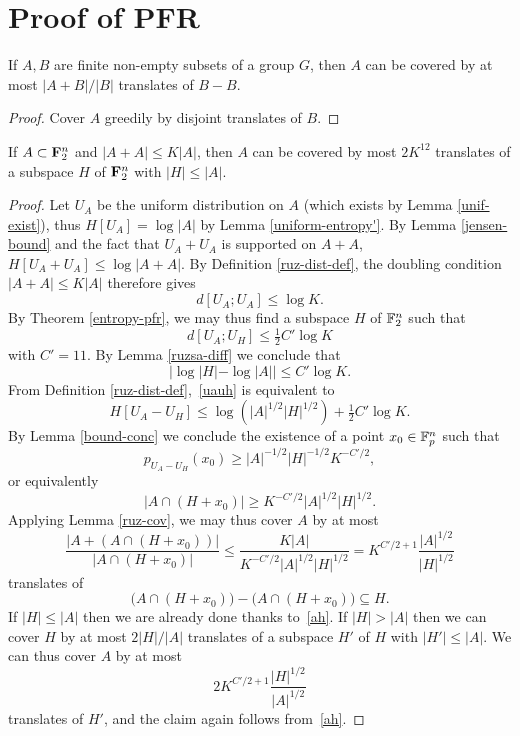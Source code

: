 \chapter{Proof of PFR}

\begin{lemma}
\label{ruz-cov}
\leanok
If $A,B$ are finite non-empty subsets of a group $G$, then $A$ can be covered by at most $|A+B|/|B|$ translates of $B-B$.
\end{lemma}
\begin{proof}
\leanok
Cover $A$ greedily by disjoint translates of $B$.
\end{proof}

\begin{theorem}[PFR]\label{pfr}
If $A \subset {\bf F}_2^n$ and $|A+A| \leq K|A|$, then $A$ can be covered by most $2K^{12}$ translates of a subspace $H$ of ${\bf F}_2^n$ with $|H| \leq |A|$.
\end{theorem}

\begin{proof}
  Let $U_A$ be the uniform distribution on $A$ (which exists by Lemma \ref{unif-exist}), thus $H[U_A] = \log |A|$ by Lemma \ref{uniform-entropy'}. By Lemma \ref{jensen-bound} and the fact that $U_A + U_A$ is supported on $A + A$, $H[U_A + U_A] \leq \log|A+A|$. By Definition \ref{ruz-dist-def}, the doubling condition $|A+A| \leq K|A|$ therefore gives
  \[ d[U_A;U_A] \leq \log K.\]
  By Theorem \ref{entropy-pfr}, we may thus find a subspace $H$ of $\mathbb{F}_2^n$ such that
  \begin{equation}\label{uauh} d[U_A;U_H] \leq \tfrac{1}{2} C' \log K\end{equation}
  with $C' = 11$.
  By Lemma \ref{ruzsa-diff} we conclude that
  \begin{equation}\label{ah}
    |\log |H| - \log |A|| \leq C' \log K.
  \end{equation}
  From Definition \ref{ruz-dist-def},~\eqref{uauh} is equivalent to
  \[ H[U_A - U_H] \leq \log( |A|^{1/2} |H|^{1/2}) + \tfrac{1}{2} C' \log K.\]
  By Lemma \ref{bound-conc} we conclude the existence of a point $x_0 \in \mathbb{F}_p^n$ such that
  \[ p_{U_A-U_H}(x_0) \geq |A|^{-1/2} |H|^{-1/2} K^{-C'/2},\]
  or equivalently
  \[ |A \cap (H + x_0)| \geq K^{-C'/2} |A|^{1/2} |H|^{1/2}.\]
  Applying Lemma \ref{ruz-cov}, we may thus cover $A$ by at most
  \[ \frac{|A + (A \cap (H+x_0))|}{|A \cap (H + x_0)|} \leq \frac{K|A|}{K^{-C'/2} |A|^{1/2} |H|^{1/2}} = K^{C'/2+1} \frac{|A|^{1/2}}{|H|^{1/2}}\]
  translates of
  \[ \bigl(A \cap (H + x_0)\bigr) - \bigl(A \cap (H + x_0)\bigr) \subseteq H.\]
  If $|H| \leq |A|$ then we are already done thanks to~\eqref{ah}.  If $|H| > |A|$ then we can cover $H$ by at most $2 |H|/|A|$ translates of a subspace $H'$ of $H$ with $|H'| \leq |A|$.  We can thus cover $A$ by at most
  \[ 2K^{C'/2+1} \frac{|H|^{1/2}}{|A|^{1/2}}\]
  translates of $H'$, and the claim again follows from~\eqref{ah}.
\end{proof}
